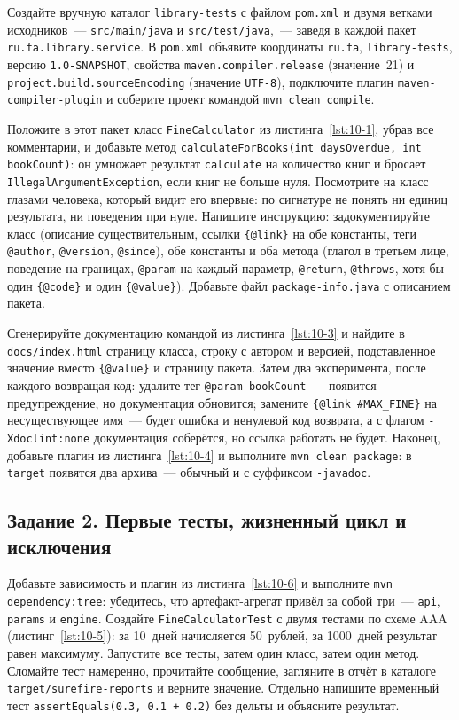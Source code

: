 Создайте вручную каталог \texttt{library-tests} с файлом \texttt{pom.xml} и двумя ветками исходников~--- \texttt{src/main/java} и \texttt{src/test/java},~--- заведя в каждой пакет \texttt{ru.fa.library.service}. В \texttt{pom.xml} объявите координаты \texttt{ru.fa}, \texttt{library-tests}, версию \texttt{1.0-SNAPSHOT}, свойства \texttt{maven.compiler.release} (значение~21) и \texttt{project.build.sourceEncoding} (значение \texttt{UTF-8}), подключите плагин \texttt{maven-compiler-plugin} и соберите проект командой \texttt{mvn clean compile}.

Положите в этот пакет класс \texttt{FineCalculator} из листинга~\ref{lst:10-1}, убрав все комментарии, и добавьте метод \texttt{calculateForBooks(int daysOverdue, int bookCount)}: он умножает результат \texttt{calculate} на количество книг и бросает \texttt{IllegalArgumentException}, если книг не больше нуля. Посмотрите на класс глазами человека, который видит его впервые: по сигнатуре не понять ни единиц результата, ни поведения при нуле. Напишите инструкцию: задокументируйте класс (описание существительным, ссылки \texttt{\{@link\}} на обе константы, теги \texttt{@author}, \texttt{@version}, \texttt{@since}), обе константы и оба метода (глагол в третьем лице, поведение на границах, \texttt{@param} на каждый параметр, \texttt{@return}, \texttt{@throws}, хотя бы один \texttt{\{@code\}} и один \texttt{\{@value\}}). Добавьте файл \texttt{package-info.java} с описанием пакета.

Сгенерируйте документацию командой из листинга~\ref{lst:10-3} и найдите в \texttt{docs/index.html} страницу класса, строку с автором и версией, подставленное значение вместо \texttt{\{@value\}} и страницу пакета. Затем два эксперимента, после каждого возвращая код: удалите тег \texttt{@param bookCount}~--- появится предупреждение, но документация обновится; замените \texttt{\{@link \#MAX\_FINE\}} на несуществующее имя~--- будет ошибка и ненулевой код возврата, а с флагом \texttt{-Xdoclint:none} документация соберётся, но ссылка работать не будет. Наконец, добавьте плагин из листинга~\ref{lst:10-4} и выполните \texttt{mvn clean package}: в \texttt{target} появятся два архива~--- обычный и с суффиксом \texttt{-javadoc}.

\subsection*{Задание 2. Первые тесты, жизненный цикл и исключения}

Добавьте зависимость и плагин из листинга~\ref{lst:10-6} и выполните \texttt{mvn dependency:tree}: убедитесь, что артефакт-агрегат привёл за собой три~--- \texttt{api}, \texttt{params} и \texttt{engine}. Создайте \texttt{FineCalculatorTest} с двумя тестами по схеме AAA (листинг~\ref{lst:10-5}): за 10~дней начисляется 50~рублей, за 1000~дней результат равен максимуму. Запустите все тесты, затем один класс, затем один метод. Сломайте тест намеренно, прочитайте сообщение, загляните в отчёт в каталоге \texttt{target/surefire-reports} и верните значение. Отдельно напишите временный тест \texttt{assertEquals(0.3, 0.1 + 0.2)} без дельты и объясните результат.

